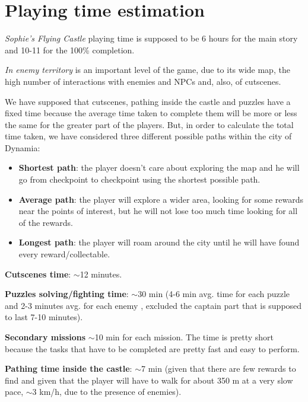 \section{Playing time estimation}
\textit{Sophie's Flying Castle} playing time is supposed to be 6 hours for the main story and 10-11 for the 100\% completion.

\textit{In enemy territory} is an important level of the game, due to its wide map, the high number of interactions with enemies and NPCs and, also, of cutscenes.

We have supposed that cutscenes, pathing inside the castle and puzzles have a fixed time because the average time taken to complete them will be more or less the same for the greater part of the players. But, in order to calculate the total time taken, we have considered three different possible paths within the city of Dynamia:
\begin{itemize}
\item \textbf{Shortest path}: the player doesn't care about exploring the map and he will go from checkpoint to checkpoint using the shortest possible path.
\item \textbf{Average path}: the player will explore a wider area, looking for some rewards near the points of interest, but he will not lose too much time looking for all of the rewards.
\item \textbf{Longest path}: the player will roam around the city until he will have found every reward/collectable.
\end{itemize}
\textbf{Cutscenes time}: $\sim$12 minutes.

\textbf{Puzzles solving/fighting time}: $\sim$30 min (4-6 min avg. time for each puzzle and 2-3 minutes avg. for each enemy , excluded the captain part that is supposed to last 7-10 minutes).

\textbf{Secondary missions} $\sim$10 min for each mission. The time is pretty short because the tasks that have to be completed are pretty fast and  easy to perform.

\textbf{Pathing time inside the castle}: $\sim$7 min (given that there are few rewards to find and given that the player will have to walk for about 350 m at a very slow pace, $\sim$3 km/h, due to the presence of enemies).

